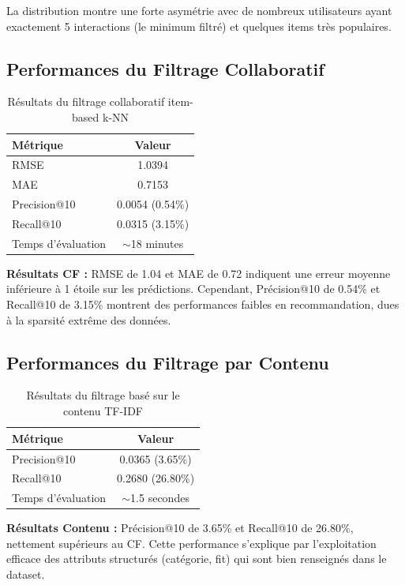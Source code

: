 \documentclass[12pt,a4paper]{article}
\begin{document}
La distribution montre une forte asymétrie avec de nombreux utilisateurs ayant exactement 5 interactions (le minimum filtré) et quelques items très populaires.

\subsection{Performances du Filtrage Collaboratif}

\begin{table}[H]
\centering
\begin{tabular}{lc}
\toprule
\textbf{Métrique} & \textbf{Valeur} \\
\midrule
RMSE & 1.0394 \\
MAE & 0.7153 \\
Precision@10 & 0.0054 (0.54\%) \\
Recall@10 & 0.0315 (3.15\%) \\
Temps d'évaluation & $\sim$18 minutes \\
\bottomrule
\end{tabular}
\caption{Résultats du filtrage collaboratif item-based k-NN}
\end{table}

\textbf{Résultats CF :} RMSE de 1.04 et MAE de 0.72 indiquent une erreur moyenne inférieure à 1 étoile sur les prédictions. Cependant, Précision@10 de 0.54\% et Recall@10 de 3.15\% montrent des performances faibles en recommandation, dues à la sparsité extrême des données.

\subsection{Performances du Filtrage par Contenu}

\begin{table}[H]
\centering
\begin{tabular}{lc}
\toprule
\textbf{Métrique} & \textbf{Valeur} \\
\midrule
Precision@10 & 0.0365 (3.65\%) \\
Recall@10 & 0.2680 (26.80\%) \\
Temps d'évaluation & $\sim$1.5 secondes \\
\bottomrule
\end{tabular}
\caption{Résultats du filtrage basé sur le contenu TF-IDF}
\end{table}

\textbf{Résultats Contenu :} Précision@10 de 3.65\% et Recall@10 de 26.80\%, nettement supérieurs au CF. Cette performance s'explique par l'exploitation efficace des attributs structurés (catégorie, fit) qui sont bien renseignés dans le dataset.
\end{document}
